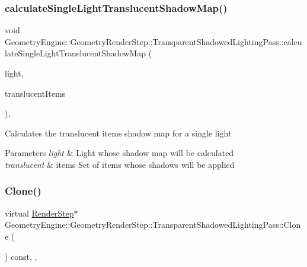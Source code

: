 \subsubsection{\texorpdfstring{calculateSingleLightTranslucentShadowMap()}{calculateSingleLightTranslucentShadowMap()}}
{\footnotesize\ttfamily void Geometry\+Engine\+::\+Geometry\+Render\+Step\+::\+Transparent\+Shadowed\+Lighting\+Pass\+::calculate\+Single\+Light\+Translucent\+Shadow\+Map (\begin{DoxyParamCaption}\item[{\mbox{\hyperlink{class_geometry_engine_1_1_geometry_world_item_1_1_geometry_light_1_1_light}{Geometry\+World\+Item\+::\+Geometry\+Light\+::\+Light}} $\ast$}]{light,  }\item[{std\+::map$<$ float, \mbox{\hyperlink{class_geometry_engine_1_1_geometry_world_item_1_1_geometry_item_1_1_geometry_item}{Geometry\+World\+Item\+::\+Geometry\+Item\+::\+Geometry\+Item}} $\ast$ $>$ $\ast$}]{translucent\+Items }\end{DoxyParamCaption})\hspace{0.3cm}{\ttfamily [protected]}, {\ttfamily [virtual]}}

Calculates the translucent items shadow map for a single light 
\begin{DoxyParams}{Parameters}
{\em light} & Light whose shadow map will be calculated \\
\hline
{\em translucent} & items Set of items whose shadows will be applied \\
\hline
\end{DoxyParams}
\mbox{\label{class_geometry_engine_1_1_geometry_render_step_1_1_transparent_shadowed_lighting_pass_a56d2ef131669ae3964a04cb54e6c3b0f}} 
\subsubsection{\texorpdfstring{Clone()}{Clone()}}
{\footnotesize\ttfamily virtual \mbox{\hyperlink{class_geometry_engine_1_1_geometry_render_step_1_1_render_step}{Render\+Step}}$\ast$ Geometry\+Engine\+::\+Geometry\+Render\+Step\+::\+Transparent\+Shadowed\+Lighting\+Pass\+::\+Clone (\begin{DoxyParamCaption}{ }\end{DoxyParamCaption}) const\hspace{0.3cm}{\ttfamily [inline]}, {\ttfamily [override]}, {\ttfamily [virtual]}}

